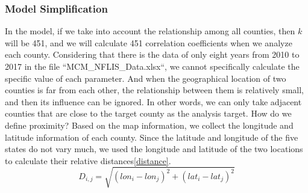\documentclass{mcmthesis}
\begin{document}
\subsubsection{Model Simplification}
In the model, if we take into account the relationship among all counties, then $k$ will be 451, and we will calculate 451 correlation coefficients when we analyze each county. Considering that there is the data of only eight years from 2010 to 2017 in the file ``MCM\_NFLIS\_Data.xlsx``, we cannot specifically calculate the specific value of each parameter. And when the geographical location of two counties is far from each other, the relationship between them is relatively small, and then its influence can be ignored. In other words, we can only take adjacent counties that are close to the target county as the analysis target. How do we define proximity? Based on the map information, we collect the longitude and latitude information of each county. Since the latitude and longitude of the five states do not vary much, we used the longitude and latitude of the two locations to calculate their relative distances\eqref{distance}.
\begin{equation}
D_{i,j} = \sqrt{(lon_i-lon_j)^2+(lat_i-lat_j)^2}
\label{distance}
\end{equation}
\end{document}

